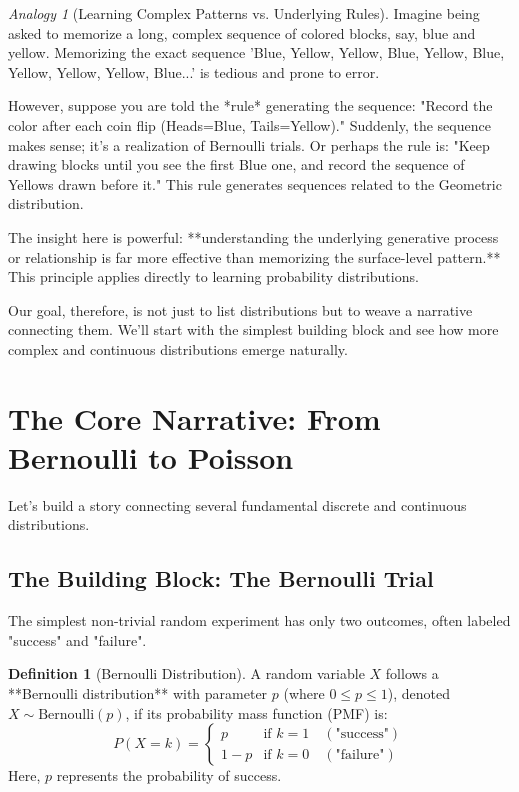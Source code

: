 \documentclass[11pt, letterpaper]{article}
\theoremstyle{definition}
\newtheorem{definition}[theorem]{Definition}
\theoremstyle{remark}
\newtheorem{analogy}[theorem]{Analogy} %
\begin{document}
\begin{analogy}[Learning Complex Patterns vs. Underlying Rules]
Imagine being asked to memorize a long, complex sequence of colored blocks, say, blue and yellow. Memorizing the exact sequence 'Blue, Yellow, Yellow, Blue, Yellow, Blue, Yellow, Yellow, Yellow, Blue...' is tedious and prone to error.

However, suppose you are told the *rule* generating the sequence: "Record the color after each coin flip (Heads=Blue, Tails=Yellow)." Suddenly, the sequence makes sense; it's a realization of Bernoulli trials. Or perhaps the rule is: "Keep drawing blocks until you see the first Blue one, and record the sequence of Yellows drawn before it." This rule generates sequences related to the Geometric distribution.

The insight here is powerful: **understanding the underlying generative process or relationship is far more effective than memorizing the surface-level pattern.** This principle applies directly to learning probability distributions.
\end{analogy}

Our goal, therefore, is not just to list distributions but to weave a narrative connecting them. We'll start with the simplest building block and see how more complex and continuous distributions emerge naturally.

\section{The Core Narrative: From Bernoulli to Poisson}

Let's build a story connecting several fundamental discrete and continuous distributions.

\subsection{The Building Block: The Bernoulli Trial}

The simplest non-trivial random experiment has only two outcomes, often labeled "success" and "failure".

\begin{definition}[Bernoulli Distribution]
A random variable $X$ follows a **Bernoulli distribution** with parameter $p$ (where $0 \le p \le 1$), denoted $X \sim \text{Bernoulli}(p)$, if its probability mass function (PMF) is:
$$ P(X=k) = \begin{cases} p & \text{if } k=1 \quad (\text{"success"}) \\ 1-p & \text{if } k=0 \quad (\text{"failure"}) \end{cases} $$
Here, $p$ represents the probability of success.
\end{definition}
\end{document}
